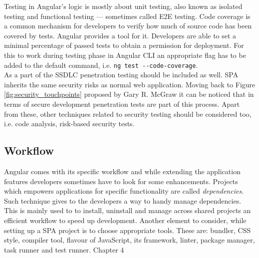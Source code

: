 \documentclass{article} %
\begin{document}
\newline
Testing in Angular's logic is mostly about unit testing, also known as isolated testing and functional testing --- sometimes called E2E testing. Code coverage is a common mechanism for developers to verify how much of source code has been covered by tests. Angular provides a tool for it. Developers are able to set a minimal percentage of passed tests to obtain a permission for deployment. For this to work during testing phase in Angular CLI an appropriate flag has to be added to the default command, i.e. \texttt{ng test -{}-code-coverage}.\\
\newline
As a part of the SSDLC penetration testing should be included as well. SPA inherits the same security risks as normal web application. Moving back to Figure \ref{fig:security_touchpoints} proposed by Gary R. McGraw \cite{bib:building_security_in} it can be noticed that in terms of secure development penetration tests are part of this process. Apart from these, other techniques related to security testing should be considered too, i.e. code analysis, risk-based security tests.
\subsection{Workflow}
Angular comes with its specific workflow and while extending the application features developers sometimes have to look for some enhancements. Projects which empowers applications for specific functionality are called \textit{dependencies}. Such technique gives to the developers a way to handy manage dependencies. This is mainly used to to install, uninstall and manage across shared projects an efficient workflow to speed up development. Another element to consider, while setting up a SPA project is to choose appropriate tools. These are: bundler, CSS style, compiler tool, flavour of JavaScript, its framework, linter, package manager, task runner and test runner.
\newpage
\huge Chapter 4
\end{document}
